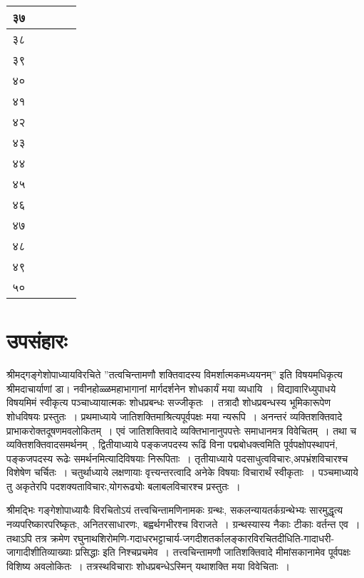 \begin{center}
\begin{tabular}{ | p{0.5cm} | p{3cm} | p{3cm} | p{4.5cm} | p{2cm} |}
	३७  &  &  & & \\ \hline
	३८  &  &  & & \\ \hline
	३९  &  &  & & \\ \hline
	४०  &  &  & & \\ \hline
	४१  &  &  & & \\ \hline
	४२  &  &  & & \\ \hline
	४३  &  &  & & \\ \hline
	४४  &  &  & & \\ \hline
	४५  &  &  & & \\ \hline
	४६  &  &  & & \\ \hline
	४७  &  &  & & \\ \hline
	४८  &  &  & & \\ \hline
	४९  &  &  & & \\ \hline
	५०  &  &  & & \\ \hline
    \hline
    \end{tabular}
\end{center}

\chapter{उपसंहारः}

	श्रीमद्गङ्गेशोपाध्यायविरचिते ”तत्वचिन्तामणौ शक्तिवादस्य विमर्शात्मकमध्ययनम्” इति विषयमधिकृत्य श्रीमदाचार्याणां डा। नवीनहोळ्ळमहाभागानां मार्गदर्शनेन शोधकार्यं मया व्यधायि~। विद्यावारिध्युपाधये विषयमिमं स्वीकृत्य पञ्चाध्यायात्मकः शोधप्रबन्धः सज्जीकृतः~। तत्रादौ शोधप्रबन्धस्य भूमिकारूपेण शोधविषयः प्रस्तुतः~। प्रथमाध्याये जातिशक्तिमाश्रित्यपूर्वपक्षः मया न्यरूपि~। अनन्तरं व्यक्तिशक्तिवादे प्राभाकरोक्तदूषणमवलोकितम्~। एवं जातिशक्तिवादे व्यक्तिभानानुपपत्तेः समाधानमत्र विवेचितम्~। तथा च व्यक्तिशक्तिवादसमर्थनम्~, द्वितीयाध्याये पङ्कजपदस्य रूढिं विना पद्मबोधक्त्वमिति पूर्वपक्षोपस्थापनं, पङ्कजपदस्य रूढेः समर्थनमित्यादिविषयाः निरूपिताः~। तृतीयाध्याये पदसाधुत्वविचारः,अपभ्रंशविचारश्च विशेषेण चर्चितः~। चतुर्थाध्याये लक्षणायाः वृत्त्यन्तरत्वादि अनेके विषयाः विचारार्थं स्वीकृताः~। पञ्चमाध्याये  तु अकृतेरपि पदशक्यताविचारः,योगरूढ्योः बलाबलविचारश्च प्रस्तुतः~।

	श्रीमद्भिः गङ्गेशोपाध्यायैः विरचितोऽयं तत्त्वचिन्तामणिनामकः ग्रन्थः, सकलन्यायतर्कग्रन्थेभ्यः सारमुद्धृत्य नव्यपरिष्कारपरिष्कृतः, अनितरसाधारणः, बह्वर्थगभीरश्च विराजते~। ग्रन्थस्यास्य नैकाः टीकाः वर्तन्त एव~। तथाऽपि तत्र  क्रमेण रघुनाथशिरोमणि-गदाधरभट्टाचार्य-जगदीशतर्कालङ्कारविरचितदीधिति-गादाधरी-जागादीशीतिव्याख्याः प्रसिद्धाः इति निश्चप्रचमेव~। तत्त्वचिन्तामणौ जातिशक्तिवादे मीमांसकानामेव पूर्वपक्षः विशिष्य अवलोकितः~। तत्रस्थविचाराः शोधप्रबन्धेऽस्मिन् यथाशक्ति मया विवेचिताः~। 

